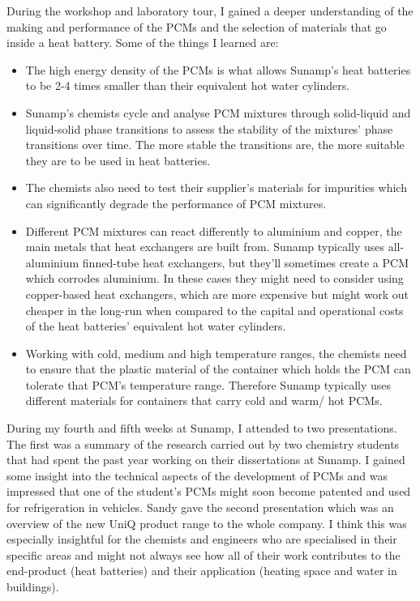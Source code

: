 During the workshop and laboratory tour, I gained a deeper understanding of the making and performance of the PCMs and the selection of materials that go inside a heat battery.
Some of the things I learned are:
\begin{itemize}
    \item The high energy density of the PCMs is what allows Sunamp's heat batteries to be 2-4 times smaller than their equivalent hot water cylinders.
    \item Sunamp's chemists cycle and analyse PCM mixtures through solid-liquid and liquid-solid phase transitions to assess the stability of the mixtures' phase transitions over time. The more stable the transitions are, the more suitable they are to be used in heat batteries.
    \item The chemists also need to test their supplier's materials for impurities which can significantly degrade the performance of PCM mixtures.
    \item Different PCM mixtures can react differently to aluminium and copper, the main metals that heat exchangers are built from. Sunamp typically uses all-aluminium finned-tube heat exchangers, but they'll sometimes create a PCM which corrodes aluminium. In these cases they might need to consider using copper-based heat exchangers, which are more expensive but might work out cheaper in the long-run when compared to the capital and operational costs of the heat batteries' equivalent hot water cylinders.
    \item Working with cold, medium and high temperature ranges, the chemists need to ensure that the plastic material of the container which holds the PCM can tolerate that PCM's temperature range. Therefore Sunamp typically uses different materials for containers that carry cold and warm/ hot PCMs.
\end{itemize}

During my fourth and fifth weeks at Sunamp, I attended to two presentations.
The first was a summary of the research carried out by two chemistry students that had spent the past year working on their dissertations at Sunamp.
I gained some insight into the technical aspects of the development of PCMs and was impressed that one of the student's PCMs might soon become patented and used for refrigeration in vehicles.
Sandy gave the second presentation which was an overview of the new UniQ product range to the whole company.
I think this was especially insightful for the chemists and engineers who are specialised in their specific areas and might not always see how all of their work contributes to the end-product (heat batteries) and their application (heating space and water in buildings).

